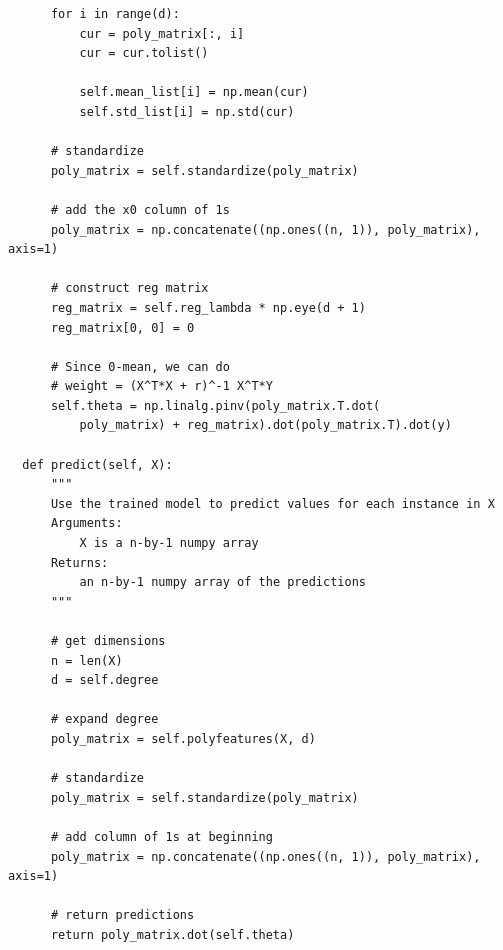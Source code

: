 \documentclass{article}
\newcommand{\1}{\mathbf{1}}
\begin{document}
{\begin{verbatim}
      for i in range(d):
          cur = poly_matrix[:, i]
          cur = cur.tolist()

          self.mean_list[i] = np.mean(cur)
          self.std_list[i] = np.std(cur)

      # standardize
      poly_matrix = self.standardize(poly_matrix)

      # add the x0 column of 1s
      poly_matrix = np.concatenate((np.ones((n, 1)), poly_matrix), axis=1)

      # construct reg matrix
      reg_matrix = self.reg_lambda * np.eye(d + 1)
      reg_matrix[0, 0] = 0

      # Since 0-mean, we can do 
      # weight = (X^T*X + r)^-1 X^T*Y
      self.theta = np.linalg.pinv(poly_matrix.T.dot(
          poly_matrix) + reg_matrix).dot(poly_matrix.T).dot(y)

  def predict(self, X):
      """
      Use the trained model to predict values for each instance in X
      Arguments:
          X is a n-by-1 numpy array
      Returns:
          an n-by-1 numpy array of the predictions
      """

      # get dimensions
      n = len(X)
      d = self.degree
      
      # expand degree
      poly_matrix = self.polyfeatures(X, d)

      # standardize
      poly_matrix = self.standardize(poly_matrix)

      # add column of 1s at beginning
      poly_matrix = np.concatenate((np.ones((n, 1)), poly_matrix), axis=1)

      # return predictions
      return poly_matrix.dot(self.theta)
\end{verbatim}

}
\end{document}
